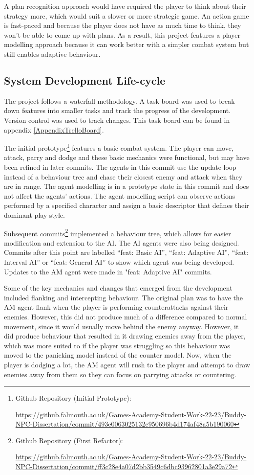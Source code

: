 \documentclass{IEEEtran}
\begin{document}
A plan recognition approach would have required the player to think about their strategy more, which would suit a slower or more strategic game. An action game is fast-paced and because the player does not have as much time to think, they won't be able to come up with plans. As a result, this project features a player modelling approach because it can work better with a simpler combat system but still enables adaptive behaviour.

\subsection{System Development Life-cycle}
\label{DevLifecycle}

The project follows a waterfall methodology. A task board was used to break down features into smaller tasks and track the progress of the development. Version control was used to track changes. This task board can be found in appendix \ref{AppendixTrelloBoard}.

The initial prototype\footnote{Github Repository (Initial Prototype):

\url{https://github.falmouth.ac.uk/Games-Academy-Student-Work-22-23/Buddy-NPC-Dissertation/commit/493e0063025132e950696b4d174af48a5b190060}} features a basic combat system. The player can move, attack, parry and dodge and these basic mechanics were functional, but may have been refined in later commits. The agents in this commit use the update loop instead of a behaviour tree and chase their closest enemy and attack when they are in range. The agent modelling is in a prototype state in this commit and does not affect the agents' actions. The agent modelling script can observe actions performed by a specified character and assign a basic descriptor that defines their dominant play style.

Subsequent commits\footnote{Github Repository (First Refactor):

\url{https://github.falmouth.ac.uk/Games-Academy-Student-Work-22-23/Buddy-NPC-Dissertation/commit/ff3c28e4a07d2bb3549c6dbc93962801a3e29a72}} implemented a behaviour tree, which allows for easier modification and extension to the AI. The AI agents were also being designed. Commits after this point are labelled “feat: Basic AI”, “feat: Adaptive AI”, “feat: Interval AI” or “feat: General AI” to show which agent was being developed. Updates to the AM agent were made in "feat: Adaptive AI" commits.

Some of the key mechanics and changes that emerged from the development included flanking and intercepting behaviour. The original plan was to have the AM agent flank when the player is performing counterattacks against their enemies. However, this did not produce much of a difference compared to normal movement, since it would usually move behind the enemy anyway. However, it did produce behaviour that resulted in it drawing enemies away from the player, which was more suited to if the player was struggling so this behaviour was moved to the panicking model instead of the counter model. Now, when the player is dodging a lot, the AM agent will rush to the player and attempt to draw enemies away from them so they can focus on parrying attacks or countering.
\end{document}
